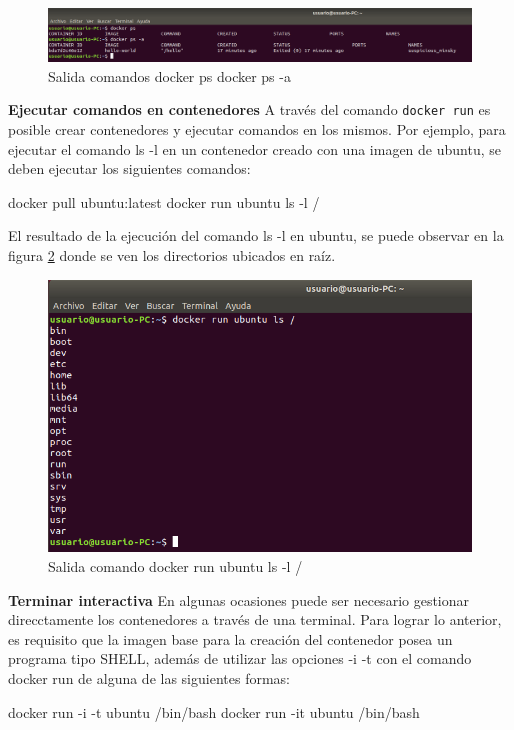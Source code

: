 \begin{figure}[!hbtp]
	\centering
	\includegraphics[width=\linewidth]{RE05_Docker/Gestion_basica/REDocker_Gestion7.png}
	\vspace{-0.2cm}
	\caption{Salida comandos docker ps  docker ps -a}
	\label{fig:DockerGestion7}
\end{figure}
\textbf{Ejecutar comandos en contenedores}
A través del comando \texttt{docker run} es posible crear contenedores y ejecutar comandos en los mismos. Por ejemplo, para ejecutar el comando ls -l en un contenedor creado con una imagen de ubuntu, se deben ejecutar los siguientes comandos:
\begin{commandshell}
docker pull ubuntu:latest
docker run ubuntu ls -l /
\end{commandshell}

El resultado de la ejecución del comando ls -l en ubuntu, se puede observar en la figura \ref{fig:DockerGestion8} donde se ven los directorios ubicados en raíz.

\begin{figure}[!hbtp]
	\centering
	\includegraphics[width=\linewidth]{RE05_Docker/Gestion_basica/REDocker_Gestion8.png}
	\vspace{-0.2cm}
	\caption{Salida comando docker run ubuntu ls -l /}
	\label{fig:DockerGestion8}
\end{figure}
\textbf{Terminar interactiva}
En algunas ocasiones puede ser necesario gestionar direcctamente los contenedores a través de una terminal. Para lograr lo anterior, es requisito que la imagen base para la creación del contenedor posea un programa tipo SHELL, además de utilizar las opciones -i -t con el comando docker run de alguna de las siguientes formas: 
\begin{commandshell}
docker run -i -t ubuntu /bin/bash
docker run -it ubuntu /bin/bash
\end{commandshell}

